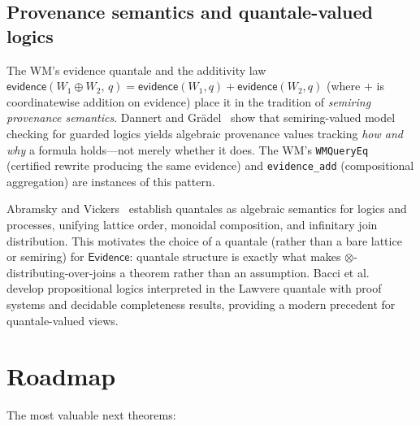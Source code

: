 \documentclass[]{article}
\newcommand{\code}[1]{\texttt{#1}}
\newcommand{\Evidence}{\mathsf{Evidence}}
\newcommand{\revise}{\mathbin{\oplus}}
\newcommand{\ev}{\mathsf{evidence}}
\begin{document}
\subsection{Provenance semantics and quantale-valued logics}

The WM's evidence quantale and the additivity law
$\ev(W_1 \revise W_2,\, q) = \ev(W_1,q) + \ev(W_2,q)$ (where $+$ is
coordinatewise addition on evidence) place it in the
tradition of \emph{semiring provenance semantics}. Dannert and
Gr\"adel~\cite{DannertGraedel2021SemiringProvenance} show that
semiring-valued model checking for guarded logics yields algebraic
provenance values tracking \emph{how and why} a formula holds---not
merely whether it does. The WM's \code{WMQueryEq} (certified rewrite
producing the same evidence) and \code{evidence\_add} (compositional
aggregation) are instances of this pattern.

Abramsky and Vickers~\cite{AbramskyVickers1993Quantales} establish
quantales as algebraic semantics for logics and processes, unifying
lattice order, monoidal composition, and infinitary join distribution.
This motivates the choice of a quantale (rather than a bare lattice or
semiring) for $\Evidence$: quantale structure is exactly what makes
$\otimes$-distributing-over-joins a theorem rather than an assumption.
Bacci et al.~\cite{BacciMardarePanangadenPlotkin2023} develop
propositional logics interpreted in the Lawvere quantale with proof
systems and decidable completeness results, providing a modern precedent
for quantale-valued views.


\section{Roadmap}
\label{sec:roadmap}

The most valuable next theorems:
\end{document}
